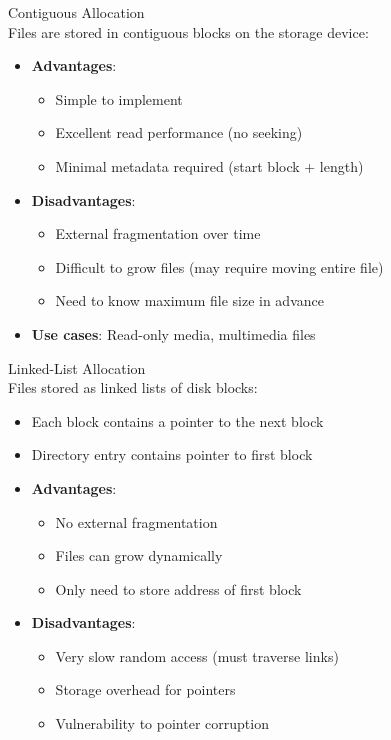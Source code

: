 \begin{definition}{Contiguous Allocation}\\
    Files are stored in contiguous blocks on the storage device:
    \begin{itemize}
        \item \textbf{Advantages}:
            \begin{itemize}
                \item Simple to implement
                \item Excellent read performance (no seeking)
                \item Minimal metadata required (start block + length)
            \end{itemize}
        \item \textbf{Disadvantages}:
            \begin{itemize}
                \item External fragmentation over time
                \item Difficult to grow files (may require moving entire file)
                \item Need to know maximum file size in advance
            \end{itemize}
        \item \textbf{Use cases}: Read-only media, multimedia files
    \end{itemize}
\end{definition}

\begin{definition}{Linked-List Allocation}\\
    Files stored as linked lists of disk blocks:
    \begin{itemize}
        \item Each block contains a pointer to the next block
        \item Directory entry contains pointer to first block
        \item \textbf{Advantages}:
            \begin{itemize}
                \item No external fragmentation
                \item Files can grow dynamically
                \item Only need to store address of first block
            \end{itemize}
        \item \textbf{Disadvantages}:
            \begin{itemize}
                \item Very slow random access (must traverse links)
                \item Storage overhead for pointers
                \item Vulnerability to pointer corruption
            \end{itemize}
    \end{itemize}
\end{definition}

